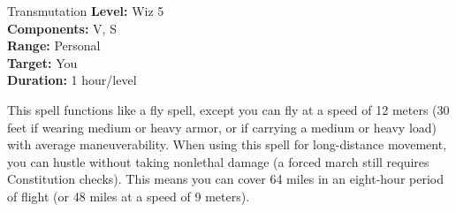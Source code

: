 {Transmutation}
{
	\textbf{Level:}
	Wiz 5\\
	\textbf{Components:}
	V, S\\
	\textbf{Range:}
	Personal\\
	\textbf{Target:}
	You\\
	\textbf{Duration:}
	1 hour/level\\
}
{
	This spell functions like a fly spell, except you can fly at a speed of 12 meters (30 feet if wearing medium or heavy armor, or if carrying a medium or heavy load) with average maneuverability. When using this spell for long-distance movement, you can hustle without taking nonlethal damage (a forced march still requires Constitution checks). This means you can cover 64 miles in an eight-hour period of flight (or 48 miles at a speed of 9 meters).

}
